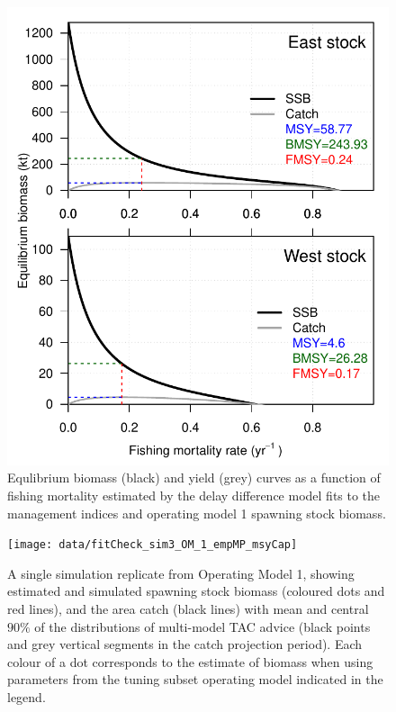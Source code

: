 \documentclass[]{article}
\begin{document}
\begin{figure}[htb]

{\centering \includegraphics[width=0.9\linewidth]{data/AM/1/BRP} 

}

\caption{Equlibrium biomass (black) and yield (grey) curves as a function of fishing mortality estimated by the delay difference model fits to the management indices and operating model 1 spawning stock biomass.}\label{fig:amRefPtsPlot}
\end{figure}

\newpage

\begin{figure}[htb]

{\centering \texttt{[image: data/fitCheck\_sim3\_OM\_1\_empMP\_msyCap]} 

}

\caption{A single simulation replicate from Operating Model 1, showing estimated and simulated spawning stock biomass (coloured dots and red lines), and the area catch (black lines) with mean and central $90\%$ of the distributions of multi-model TAC advice (black points and grey vertical segments in the catch projection period). Each colour of a dot corresponds to the estimate of biomass when using parameters from the tuning subset operating model indicated in the legend.}\label{fig:unnamed-chunk-5}
\end{figure}
\end{document}
